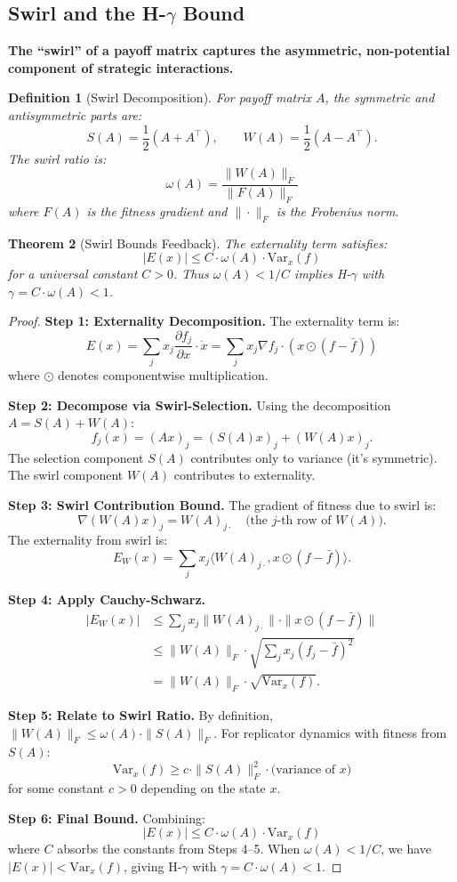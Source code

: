 \documentclass[12pt]{article}
\newtheorem{theorem}{Theorem}[section]
\newtheorem{definition}[theorem]{Definition}
\newcommand{\Var}{\mathrm{Var}}
\newcommand{\added}[1]{\textbf{#1}}
\begin{document}
\subsection{Swirl and the H-$\gamma$ Bound}

\added{\textbf{The ``swirl'' of a payoff matrix captures the asymmetric, non-potential component of strategic interactions.}}

\begin{definition}[Swirl Decomposition]
For payoff matrix $A$, the \emph{symmetric} and \emph{antisymmetric} parts are:
\[
S(A) = \frac{1}{2}(A + A^\top), \qquad W(A) = \frac{1}{2}(A - A^\top).
\]
The \emph{swirl ratio} is:
\[
\omega(A) = \frac{\|W(A)\|_F}{\|F(A)\|_F}
\]
where $F(A)$ is the fitness gradient and $\|\cdot\|_F$ is the Frobenius norm.
\end{definition}

\begin{theorem}[Swirl Bounds Feedback]
\label{thm:swirl-bound}
The externality term satisfies:
\[
|E(x)| \leq C \cdot \omega(A) \cdot \Var_x(f)
\]
for a universal constant $C > 0$. Thus $\omega(A) < 1/C$ implies H-$\gamma$ with $\gamma = C \cdot \omega(A) < 1$.
\end{theorem}

\begin{proof}
\textbf{Step 1: Externality Decomposition.}
The externality term is:
\[
E(x) = \sum_j x_j \frac{\partial f_j}{\partial x} \cdot \dot{x} = \sum_j x_j \nabla f_j \cdot (x \odot (f - \bar{f}))
\]
where $\odot$ denotes componentwise multiplication.

\textbf{Step 2: Decompose via Swirl-Selection.}
Using the decomposition $A = S(A) + W(A)$:
\[
f_j(x) = (Ax)_j = (S(A)x)_j + (W(A)x)_j.
\]
The selection component $S(A)$ contributes only to variance (it's symmetric). The swirl component $W(A)$ contributes to externality.

\textbf{Step 3: Swirl Contribution Bound.}
The gradient of fitness due to swirl is:
\[
\nabla (W(A)x)_j = W(A)_{j\cdot} \quad \text{(the } j\text{-th row of } W(A)).
\]
The externality from swirl is:
\[
E_W(x) = \sum_j x_j \langle W(A)_{j\cdot}, x \odot (f - \bar{f}) \rangle.
\]

\textbf{Step 4: Apply Cauchy-Schwarz.}
\begin{align*}
|E_W(x)| &\leq \sum_j x_j \|W(A)_{j\cdot}\| \cdot \|x \odot (f - \bar{f})\| \\
&\leq \|W(A)\|_F \cdot \sqrt{\sum_j x_j (f_j - \bar{f})^2} \\
&= \|W(A)\|_F \cdot \sqrt{\Var_x(f)}.
\end{align*}

\textbf{Step 5: Relate to Swirl Ratio.}
By definition, $\|W(A)\|_F \leq \omega(A) \cdot \|S(A)\|_F$. For replicator dynamics with fitness from $S(A)$:
\[
\Var_x(f) \geq c \cdot \|S(A)\|_F^2 \cdot \text{(variance of } x \text{)}
\]
for some constant $c > 0$ depending on the state $x$.

\textbf{Step 6: Final Bound.}
Combining:
\[
|E(x)| \leq C \cdot \omega(A) \cdot \Var_x(f)
\]
where $C$ absorbs the constants from Steps 4--5. When $\omega(A) < 1/C$, we have $|E(x)| < \Var_x(f)$, giving H-$\gamma$ with $\gamma = C \cdot \omega(A) < 1$.
\end{proof}
\end{document}
